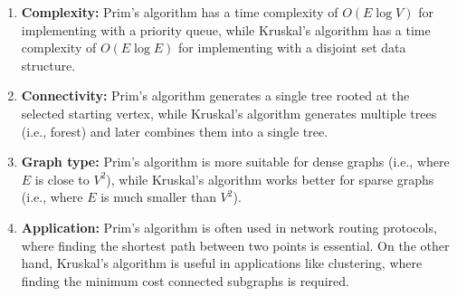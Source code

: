 \documentclass[11pt]{article}
\begin{document}
\begin{enumerate}
\begin{enumerate}
              \item \textbf{Complexity:} Prim's algorithm has a time complexity of $O(E\log V)$ for implementing with a priority queue, while Kruskal's algorithm has a time complexity of $O(E\log E)$ for implementing with a disjoint set data structure.

              \item \textbf{Connectivity:} Prim's algorithm generates a single tree rooted at the selected starting vertex, while Kruskal's algorithm generates multiple trees (i.e., forest) and later combines them into a single tree.

              \item \textbf{Graph type:} Prim's algorithm is more suitable for dense graphs (i.e., where $E$ is close to $V^2$), while Kruskal's algorithm works better for sparse graphs (i.e., where $E$ is much smaller than $V^2$).

              \item \textbf{Application:} Prim's algorithm is often used in network routing protocols, where finding the shortest path between two points is essential. On the other hand, Kruskal's algorithm is useful in applications like clustering, where finding the minimum cost connected subgraphs is required.


\end{enumerate}
\end{enumerate}
\end{document}
